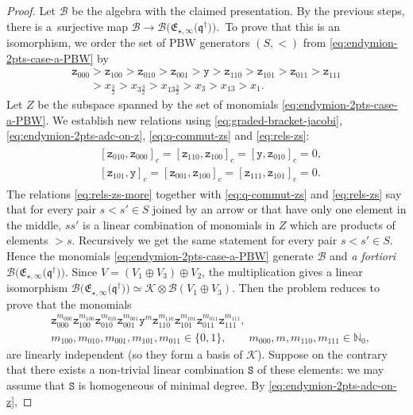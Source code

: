 \documentclass[10pt,a4paper]{amsart}
\numberwithin{equation}{section}
\newcommand{\toba}{\mathscr B}
\newcommand{\K}{{\mathcal{K}}}
\newcommand{\N}{{\mathbb N}}
\newcommand{\yt}{\mathtt{y}}
\newcommand{\zt}{\mathtt{z}}
\newcommand{\eny}{\mathfrak{E}}
\newcommand{\enyIIb}[1]{\eny_{\star,#1}}
\newcommand{\bq}{\mathfrak{q}}
\newcommand{\bqs}{\bq^{\dagger}}
\newcommand{\tresdos}{\frac{3}{2}}
\begin{document}
\begin{proof}
Let $\toba$ be the algebra with the claimed presentation. By the previous steps,
there is a~surjective map $\toba \to \toba\big(\enyIIb{\infty}\big(\bqs\big)\big)$.\
To prove that this is an isomorphism, we order the set of PBW generators $(S,<)$ from \eqref{eq:endymion-2pts-case-a-PBW}
by
\begin{gather*}
\zt_{000}>\zt_{100}>\zt_{010}> \zt_{001} > \yt > \zt_{110} > \zt_{101} > \zt_{011} > \zt_{111}
\\ \phantom{\zt_{000}}
{}> x_{\tresdos} > x_{3\tresdos} > x_{13\tresdos} > x_3 > x_{13} > x_1.
\end{gather*}
Let $Z$ be the subspace spanned by the set of monomials \eqref{eq:endymion-2pts-case-a-PBW}.
We establish new relations using \eqref{eq:graded-bracket-jacobi},
\eqref{eq:endymion-2pts-adc-on-z}, \eqref{eq:q-commut-zs} and \eqref{eq:rels-zs}:
\begin{align}\label{eq:rels-zs-more}
\begin{aligned}
&[ \zt_{010},\zt_{000}]_c = [ \zt_{110},\zt_{100}]_c = [ \yt,\zt_{010}]_c = 0,
\\
&[ \zt_{101}, \yt ]_c = [ \zt_{001},\zt_{100}]_c = [ \zt_{111},\zt_{101}]_c = 0.
\end{aligned}
\end{align}
The relations \eqref{eq:rels-zs-more} together with \eqref{eq:q-commut-zs} and \eqref{eq:rels-zs}
say that for every pair $s<s'\in S$ joined by an arrow or that have only one element in the middle, $ss'$ is a linear combination of monomials in $Z$ which are products of elements $>s$. Recursively we get the same statement for every pair $s<s'\in S$. Hence the monomials
\eqref{eq:endymion-2pts-case-a-PBW} generate $\toba$ and \emph{a fortiori} $\toba\big(\enyIIb{\infty}\big(\bqs\big)\big)$.
Since $V = (V_1 \oplus V_3) \oplus V_2$, the multiplication gives a linear isomorphism $\toba\big(\enyIIb{\infty}\big(\bqs\big)\big) \simeq \K \otimes \toba(V_1\oplus V_3)$. Then the problem reduces to prove that the monomials
\begin{align*}
& \zt_{000}^{m_{000}} \zt_{100}^{m_{100}} \zt_{010}^{m_{010}} \zt_{001}^{m_{001}} \yt^m \zt_{110}^{m_{110}} \zt_{101}^{m_{101}} \zt_{011}^{m_{011}} \zt_{111}^{m_{111}},
\\
& m_{100}, m_{010}, m_{001}, m_{101},m_{011} \in \{0,1\}, \qquad m_{000}, m, m_{110}, m_{111} \in\N_0,
\end{align*}
are linearly independent (so they form a basis of $\K$). Suppose on the contrary that there exists a non-trivial linear combination $\mathtt{S}$ of these elements: we may assume that $\mathtt{S}$ is homogeneous of minimal degree. By \eqref{eq:endymion-2pts-adc-on-z},

\end{proof}
\end{document}
